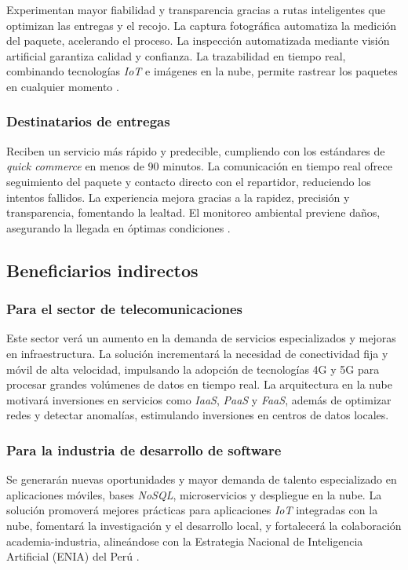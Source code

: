 Experimentan mayor fiabilidad y transparencia gracias a rutas inteligentes que optimizan las entregas y el recojo. La captura fotográfica automatiza la medición del paquete, acelerando el proceso. La inspección automatizada mediante visión artificial garantiza calidad y confianza. La trazabilidad en tiempo real, combinando tecnologías \textit{IoT} e imágenes en la nube, permite rastrear los paquetes en cualquier momento \cite{WebRef132361}.

\subsubsection{Destinatarios de entregas}

Reciben un servicio más rápido y predecible, cumpliendo con los estándares de \textit{quick commerce} en menos de 90 minutos. La comunicación en tiempo real ofrece seguimiento del paquete y contacto directo con el repartidor, reduciendo los intentos fallidos. La experiencia mejora gracias a la rapidez, precisión y transparencia, fomentando la lealtad. El monitoreo ambiental previene daños, asegurando la llegada en óptimas condiciones \cite{WebRef132362}.


\subsection{Beneficiarios indirectos}

\subsubsection{Para el sector de telecomunicaciones}

Este sector verá un aumento en la demanda de servicios especializados y mejoras en infraestructura. La solución incrementará la necesidad de conectividad fija y móvil de alta velocidad, impulsando la adopción de tecnologías 4G y 5G para procesar grandes volúmenes de datos en tiempo real. La arquitectura en la nube motivará inversiones en servicios como \textit{IaaS}, \textit{PaaS} y \textit{FaaS}, además de optimizar redes y detectar anomalías, estimulando inversiones en centros de datos locales.

\subsubsection{Para la industria de desarrollo de software}

Se generarán nuevas oportunidades y mayor demanda de talento especializado en aplicaciones móviles, bases \textit{NoSQL}, microservicios y despliegue en la nube. La solución promoverá mejores prácticas para aplicaciones \textit{IoT} integradas con la nube, fomentará la investigación y el desarrollo local, y fortalecerá la colaboración academia-industria, alineándose con la Estrategia Nacional de Inteligencia Artificial (ENIA) del Perú \cite{ArticleRef255132}.


